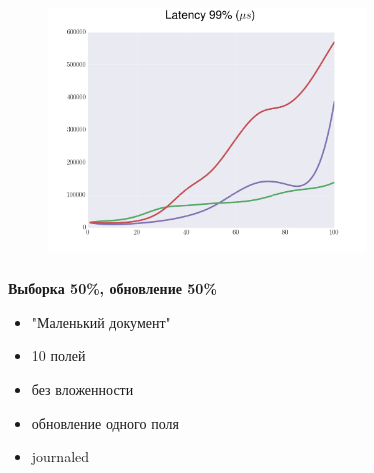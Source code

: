 \documentclass[usenames,dvipsnames, 18pt, compress, aspectratio=169]{beamer}
\begin{document}
\begin{frame}
    \frametitle{}
    \begin{center}
    \begin{figure}
        \includegraphics[width=0.75\textwidth,center]{benchmarks/workload_a_mongo_config/latency_99.png}
    \end{figure}
    \end{center}
\end{frame}

\begin{frame}
    \frametitle{}
    \begin{center}
        \textbf{Выборка 50\%, обновление 50\%}
        \begin{itemize}[label={}]
            \item "Маленький документ"
            \item 10 полей
            \item без вложенности
            \item обновление одного поля
            \item journaled
        \end{itemize}
    \end{center}
\end{frame}
\end{document}
